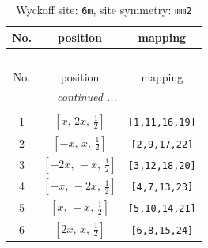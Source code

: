 \documentclass[fleqn,8pt]{jsarticle}
\begin{document}
\renewcommand{\arraystretch}{1.2}
\begin{longtable}{ccc}
\caption{Wyckoff site: {\tt 6m}, site symmetry: {\tt mm2}}
 \\
 \hline \hline
No. & position & mapping \\ \hline \endfirsthead

\multicolumn{2}{l}{\tablename\ \thetable{}} \\
 \hline \hline
No. & position & mapping \\ \hline \endhead

 \hline \hline
\multicolumn{2}{r}{\footnotesize\it continued ...} \\ \endfoot

 \hline \hline
\multicolumn{2}{r}{} \\ \endlastfoot

1 & $\left[ x,\, 2 x,\, \frac{1}{2} \right]$ & {\tt [1,11,16,19]} \\ \hline
2 & $\left[ - x,\, x,\, \frac{1}{2} \right]$ & {\tt [2,9,17,22]} \\ \hline
3 & $\left[ - 2 x,\, - x,\, \frac{1}{2} \right]$ & {\tt [3,12,18,20]} \\ \hline
4 & $\left[ - x,\, - 2 x,\, \frac{1}{2} \right]$ & {\tt [4,7,13,23]} \\ \hline
5 & $\left[ x,\, - x,\, \frac{1}{2} \right]$ & {\tt [5,10,14,21]} \\ \hline
6 & $\left[ 2 x,\, x,\, \frac{1}{2} \right]$ & {\tt [6,8,15,24]} \\
\end{longtable}
\renewcommand{\arraystretch}{1.2}
\end{document}
